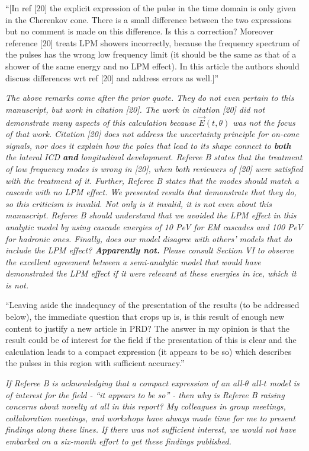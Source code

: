 \documentclass[12pt]{article}
\begin{document}
``[In ref [20] the explicit expression of the pulse in the time domain is only given in the Cherenkov cone. There is a small difference between the two expressions but no comment is made on this difference.  Is this a correction? Moreover reference [20] treats LPM showers incorrectly, because the frequency spectrum of the pulses has the wrong low frequency limit (it should be the same as that of a shower of the same energy and no LPM effect). In this article the authors should discuss differences wrt ref [20] and address errors as well.]''

\textit{The above remarks come after the prior quote.  They do not even pertain to this manuscript, but work in citation [20].  The work in citation [20] did not demonstrate many aspects of this calculation because $\vec{E}(t,\theta)$ was not the focus of that work.  Citation [20] does not address the uncertainty principle for on-cone signals, nor does it explain how the poles that lead to its shape connect to \textbf{both} the lateral ICD \textbf{and} longitudinal development.  Referee B states that the treatment of low frequency modes is wrong in [20], when both reviewers of [20] were satisfied with the treatment of it.  Further, Referee B states that the modes should match a cascade with no LPM effect.  We presented results that demonstrate that they do, so this criticism is invalid.  Not only is it invalid, it is not even about this manuscript.  Referee B should understand that we avoided the LPM effect in this analytic model by using cascade energies of 10 PeV for EM cascades and 100 PeV for hadronic ones.  Finally, does our model disagree with others' models that do include the LPM effect? \textbf{Apparently not.}  Please consult Section VI to observe the excellent agreement between a semi-analytic model that would have demonstrated the LPM effect if it were relevant at these energies in ice, which it is not.}

``Leaving aside the inadequacy of the presentation of the results (to be addressed below), the immediate question that crops up is, is this result of enough new content to justify a new article in PRD? The answer in my opinion is that the result could be of interest for the field if the presentation of this is clear and the calculation leads to a compact expression (it appears to be so) which describes the pulses in this region with sufficient accuracy.''

\textit{If Referee B is acknowledging that a compact expression of an all-$\theta$ all-$t$ model is of interest for the field - ``it appears to be so'' - then why is Referee B raising concerns about novelty at all in this report?  My colleagues in group meetings, collaboration meetings, and workshops have always made time for me to present findings along these lines.  If there was not sufficient interest, we would not have embarked on a six-month effort to get these findings published.}
\end{document}
